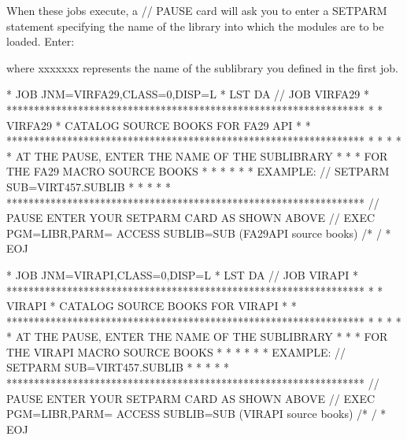 \documentclass[letterpaper,10pt,english]{sphinxmanual}
\begin{document}
When these jobs execute, a // PAUSE card will ask you to enter a SETPARM statement specifying the name of the library into which the modules are to be loaded. Enter:

\begin{sphinxVerbatim}[commandchars=\\\{\}]
  
\end{sphinxVerbatim}

where  xxxxxxx represents the name of the sublibrary you defined in the first job.

\begin{sphinxVerbatim}[commandchars=\\\{\}]
* \PYGZdl{}\PYGZdl{} JOB JNM=VIRFA29,CLASS=0,DISP=L
* \PYGZdl{}\PYGZdl{} LST DA
// JOB VIRFA29
* *****************************************************************
* * VIRFA29 * CATALOG SOURCE BOOKS FOR FA29 API                   *
* *****************************************************************
* *                                                               *
* * AT THE PAUSE, ENTER THE NAME OF THE SUB\PYGZhy{}LIBRARY               *
* * FOR THE FA29 MACRO SOURCE BOOKS                               *
* *                                                               *
* * EXAMPLE: // SETPARM SUB=\PYGZsq{}VIRT457.SUBLIB\PYGZsq{}                      *
* *                                                               *
* *****************************************************************
// PAUSE ENTER YOUR SETPARM CARD AS SHOWN ABOVE
// EXEC PGM=LIBR,PARM=\PYGZsq{} ACCESS SUBLIB=\PYGZam{}SUB\PYGZsq{}
        (FA29API source books)
/*
/\PYGZam{}
* \PYGZdl{}\PYGZdl{} EOJ
\end{sphinxVerbatim}


\begin{sphinxVerbatim}[commandchars=\\\{\}]
* \PYGZdl{}\PYGZdl{} JOB JNM=VIRAPI,CLASS=0,DISP=L
* \PYGZdl{}\PYGZdl{} LST DA
// JOB VIRAPI
* *****************************************************************
* * VIRAPI * CATALOG SOURCE BOOKS FOR VIRAPI                      *
* *****************************************************************
* *                                                               *
* * AT THE PAUSE, ENTER THE NAME OF THE SUB\PYGZhy{}LIBRARY               *
* * FOR THE VIRAPI MACRO SOURCE BOOKS                             *
* *                                                               *
* * EXAMPLE: // SETPARM SUB=\PYGZsq{}VIRT457.SUBLIB\PYGZsq{}                      *
* *                                                               *
* *****************************************************************
// PAUSE ENTER YOUR SETPARM CARD AS SHOWN ABOVE
// EXEC PGM=LIBR,PARM=\PYGZsq{} ACCESS SUBLIB=\PYGZam{}SUB\PYGZsq{}
        (VIRAPI source books)
/*
/\PYGZam{}
* \PYGZdl{}\PYGZdl{} EOJ
\end{sphinxVerbatim}
\end{document}
